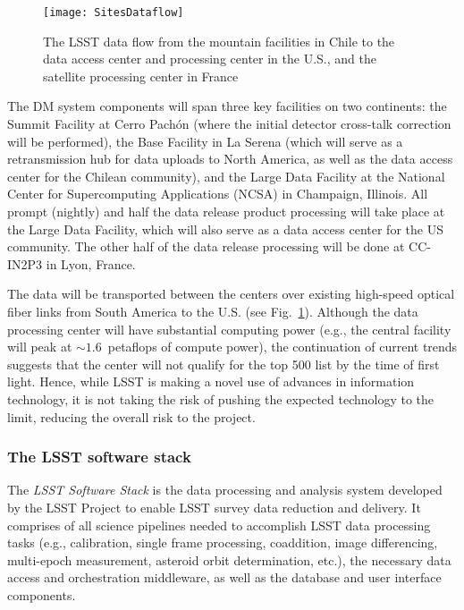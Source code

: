 \begin{figure}
\hskip 0.01in
\texttt{[image: SitesDataflow]}
\caption{The LSST data flow from the mountain facilities in
Chile to the data access center and processing center in the U.S., and
the satellite processing center in France}
\label{Fig:DM2}
\end{figure}

The DM system components will span three key facilities on two
continents: the Summit Facility at  Cerro Pach\'on (where the initial
detector cross-talk
correction will be performed), the Base Facility in La Serena (which will serve
as a retransmission hub for data
uploads to North America, as well as the data access center for the Chilean
community), and the Large Data Facility at the National Center
for Supercomputing Applications (NCSA) in Champaign, Illinois.
All prompt (nightly) and half the data release product processing will take place at the
Large Data Facility, which will also serve as a data access center
for the US community.
The other half of the data release processing will be done at CC-IN2P3 in
Lyon, France.

The data will be transported between the centers over existing high-speed optical fiber
links from South America to the U.S. (see Fig.~\ref{Fig:DM2}).
Although the data processing center will have substantial computing
power (e.g., the central facility will peak at $\sim 1.6$~petaflops of
compute power), the continuation of current trends suggests that the center will
not qualify for the top 500 list by the time of first light.
Hence, while LSST is making a novel use of advances in information technology,
it is not taking the risk of pushing the expected technology to the limit, reducing
the overall risk to the project.

\subsubsection{The LSST software stack}
\label{sec:dmstack}

The {\em LSST Software Stack} is the data processing and analysis
system developed by the LSST Project to enable LSST survey data
reduction and delivery. It comprises of
all science pipelines needed to accomplish LSST data processing tasks
(e.g., calibration, single frame processing, coaddition, image
differencing, multi-epoch measurement, asteroid orbit determination,
etc.), the necessary data
access and orchestration middleware, as well as the database and user
interface components.



